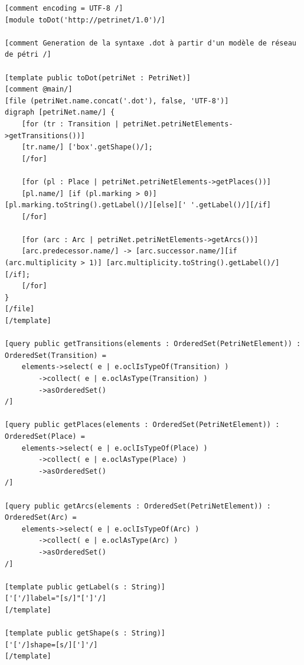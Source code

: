 \begin{lstlisting}[caption=toDot.mtl]
[comment encoding = UTF-8 /]
[module toDot('http://petrinet/1.0')/]

[comment Generation de la syntaxe .dot à partir d'un modèle de réseau de pétri /]

[template public toDot(petriNet : PetriNet)]
[comment @main/]
[file (petriNet.name.concat('.dot'), false, 'UTF-8')]
digraph [petriNet.name/] {
	[for (tr : Transition | petriNet.petriNetElements->getTransitions())]
	[tr.name/] ['box'.getShape()/];
	[/for]

	[for (pl : Place | petriNet.petriNetElements->getPlaces())]
	[pl.name/] [if (pl.marking > 0)][pl.marking.toString().getLabel()/][else][' '.getLabel()/][/if]
	[/for]

	[for (arc : Arc | petriNet.petriNetElements->getArcs())]
	[arc.predecessor.name/] -> [arc.successor.name/][if (arc.multiplicity > 1)] [arc.multiplicity.toString().getLabel()/] [/if];
	[/for]
}
[/file]
[/template]

[query public getTransitions(elements : OrderedSet(PetriNetElement)) : OrderedSet(Transition) = 
	elements->select( e | e.oclIsTypeOf(Transition) )
		->collect( e | e.oclAsType(Transition) )
		->asOrderedSet()
/]

[query public getPlaces(elements : OrderedSet(PetriNetElement)) : OrderedSet(Place) = 
	elements->select( e | e.oclIsTypeOf(Place) )
		->collect( e | e.oclAsType(Place) )
		->asOrderedSet()
/]

[query public getArcs(elements : OrderedSet(PetriNetElement)) : OrderedSet(Arc) = 
	elements->select( e | e.oclIsTypeOf(Arc) )
		->collect( e | e.oclAsType(Arc) )
		->asOrderedSet()
/]

[template public getLabel(s : String)]
['['/]label="[s/]"[']'/]
[/template]

[template public getShape(s : String)]
['['/]shape=[s/][']'/]
[/template]
\end{lstlisting}


